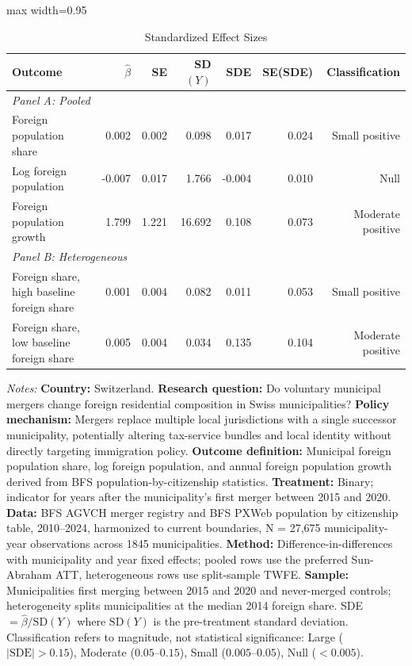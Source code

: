 \begin{table}[htbp]\centering
\caption{Standardized Effect Sizes}
\begin{adjustbox}{max width=0.95\textwidth}
\begin{tabular}{lrrrrrr}
\toprule
Outcome & $\hat{\beta}$ & SE & SD$(Y)$ & SDE & SE(SDE) & Classification \\
\midrule
\multicolumn{7}{l}{\textit{Panel A: Pooled}} \\
Foreign population share & 0.002 & 0.002 & 0.098 & 0.017 & 0.024 & Small positive \\
Log foreign population & -0.007 & 0.017 & 1.766 & -0.004 & 0.010 & Null \\
Foreign population growth & 1.799 & 1.221 & 16.692 & 0.108 & 0.073 & Moderate positive \\
\midrule
\multicolumn{7}{l}{\textit{Panel B: Heterogeneous}} \\
Foreign share, high baseline foreign share & 0.001 & 0.004 & 0.082 & 0.011 & 0.053 & Small positive \\
Foreign share, low baseline foreign share & 0.005 & 0.004 & 0.034 & 0.135 & 0.104 & Moderate positive \\
\bottomrule
\end{tabular}
\end{adjustbox}
\parbox{0.95\textwidth}{\footnotesize \textit{Notes:} \textbf{Country:} Switzerland. \textbf{Research question:} Do voluntary municipal mergers change foreign residential composition in Swiss municipalities? \textbf{Policy mechanism:} Mergers replace multiple local jurisdictions with a single successor municipality, potentially altering tax-service bundles and local identity without directly targeting immigration policy. \textbf{Outcome definition:} Municipal foreign population share, log foreign population, and annual foreign population growth derived from BFS population-by-citizenship statistics. \textbf{Treatment:} Binary; indicator for years after the municipality's first merger between 2015 and 2020. \textbf{Data:} BFS AGVCH merger registry and BFS PXWeb population by citizenship table, 2010--2024, harmonized to current boundaries, N = 27,675 municipality-year observations across 1845 municipalities. \textbf{Method:} Difference-in-differences with municipality and year fixed effects; pooled rows use the preferred Sun-Abraham ATT, heterogeneous rows use split-sample TWFE. \textbf{Sample:} Municipalities first merging between 2015 and 2020 and never-merged controls; heterogeneity splits municipalities at the median 2014 foreign share. SDE $= \hat{\beta} / \mathrm{SD}(Y)$ where $\mathrm{SD}(Y)$ is the pre-treatment standard deviation. Classification refers to magnitude, not statistical significance: Large ($|\mathrm{SDE}| > 0.15$), Moderate ($0.05$--$0.15$), Small ($0.005$--$0.05$), Null ($< 0.005$).}
\end{table}
